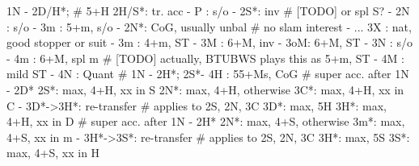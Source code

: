 1N - 2D/H*;  # 5+H
2H/S*: tr. acc
     - P  : s/o
     - 2S*: inv  # [TODO] or spl S?
          - 2N : s/o
              - 3m : 5+m, s/o
     - 2N*: CoG, usually unbal  # no slam interest
          - ... 3X : nat, good stopper or suit
     - 3m : 4+m, ST
     - 3M : 6+M, inv
     - 3oM: 6+M, ST
     - 3N : s/o
     - 4m : 6+M, spl m  # [TODO] actually, BTUBWS plays this as 5+m, ST
     - 4M : mild ST
     - 4N : Quant
# 1N - 2H*; 2S*- 4H : 55+Ms, CoG
# super acc. after 1N - 2D*
2S*: max, 4+H, xx in S
2N*: max, 4+H, otherwise
3C*: max, 4+H, xx in C
   - 3D*->3H*: re-transfer  # applies to 2S, 2N, 3C
3D*: max, 5H
3H*: max, 4+H, xx in D
# super acc. after 1N - 2H*
2N*: max, 4+S, otherwise
3m*: max, 4+S, xx in m
   - 3H*->3S*: re-transfer  # applies to 2S, 2N, 3C
3H*: max, 5S
3S*: max, 4+S, xx in H

